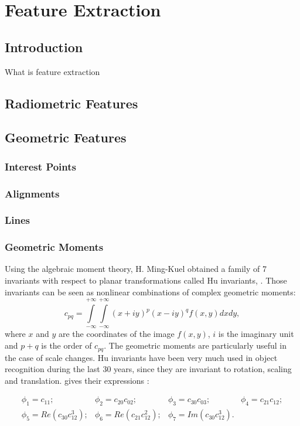\chapter{Feature Extraction}
\section{Introduction}
What is feature extraction
\section{Radiometric Features}

\section{Geometric Features}
\subsection{Interest Points}

\subsection{Alignments}
\label{sec:Alignments}

\subsection{Lines}
\subsection{Geometric Moments}

Using the algebraic moment theory, H. Ming-Kuel obtained a family of 7
invariants with respect to planar transformations called Hu invariants,
\cite{hu}. Those invariants can be seen as nonlinear combinations of
complex geometric moments:
\begin {equation}
c_{pq} = \int\limits_{-\infty}^{+\infty}\int\limits_{-\infty}^{+\infty}(x + iy)^p(x- iy)^qf(x,y)dxdy,
\label{2.2}
\end{equation}
where $x$ and $y$ are the coordinates of the image $f(x,y)$, $i$ is the
imaginary unit and
$p+q$ is the order of $c_{pq}$. The geometric moments are
particularly useful in the case of scale changes. Hu invariants have
been very much used in object recognition during the last 30 years,
since they are invariant to rotation, scaling and translation. \cite{flusserinv} gives their expressions :

\begin{equation}
\begin{array}{cccc}
\phi_1 = c_{11};& \phi_2 = c_{20}c_{02};& \phi_3 = c_{30}c_{03};& \phi_4 = c_{21}c_{12};\\
\phi_5 = Re(c_{30}c_{12}^3);& \phi_6 = Re(c_{21}c_{12}^2);& \phi_7 = Im(c_{30}c_{12}^3).&\\
\end{array}
\end{equation}


